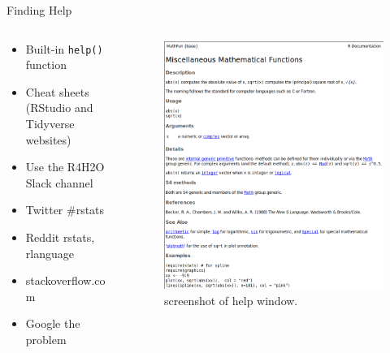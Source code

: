 \documentclass[
  ignorenonframetext,
]{beamer}
\providecommand{\tightlist}{%
  \setlength{\itemsep}{0pt}\setlength{\parskip}{0pt}}
\begin{document}
\begin{frame}[fragile]{Finding Help}
\protect\hypertarget{finding-help}{}
\begin{columns}[T]
\begin{column}{0.5\textwidth}
\begin{itemize}
\tightlist
\item
  Built-in \texttt{help()} function
\item
  Cheat sheets (RStudio and Tidyverse websites)
\item
  Use the R4H2O Slack channel
\item
  Twitter \#rstats
\item
  Reddit rstats, rlanguage
\item
  stackoverflow.com
\item
  Google the problem
\end{itemize}
\end{column}

\begin{column}{0.5\textwidth}
\begin{figure}
\centering
\includegraphics{images/help.png}
\caption{screenshot of help window.}
\end{figure}
\end{column}
\end{columns}
\end{frame}
\end{document}
